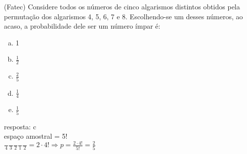 \begin{ex}
 (Fatec) Considere todos os números de cinco algarismos distintos obtidos pela permutação dos algarismos 4, 5, 6, 7 e 8. Escolhendo-se um desses números, ao acaso, a probabilidade dele ser um número ímpar é:
    \begin{enumerate}[(a)]
    \item 1
    \item $\frac{1}{2}$
    \item $\frac{2}{5}$
    \item $\frac{1}{4}$
    \item $\frac{1}{5}$
    \end{enumerate}
     \begin{sol}
       resposta: c \\
       espaço amostral = 5! \\
       $\frac{\phantom{A}}{4}\frac{\phantom{A}}{3}\frac{\phantom{A}}{2}\frac{\phantom{A}}{1}\frac{\phantom{A}}{2}=2\cdot4!
       \Longrightarrow p =\frac{2\cdot4!}{5!}=\frac{2}{5}$
     \end{sol}
\end{ex}